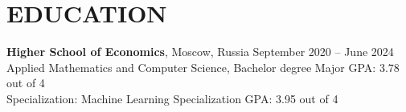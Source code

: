 \section*{EDUCATION}
\noindent
\textbf{Higher School of Economics}, Moscow, Russia 
\hfill September 2020 -- June 2024 
\\
Applied Mathematics and Computer Science, Bachelor degree 
\hfill  Major GPA: 3.78 out of 4 
\\
Specialization: Machine Learning
\hfill Specialization GPA: 3.95 out of 4

